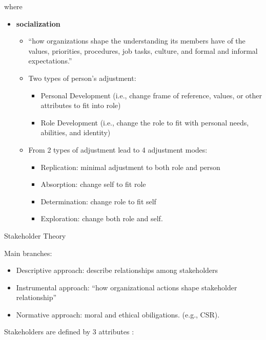\documentclass[
]{book}
\providecommand{\tightlist}{%
  \setlength{\itemsep}{0pt}\setlength{\parskip}{0pt}}
\begin{document}
where \citep{Lewis_2011}

\begin{itemize}
\item
  \textbf{socialization}

  \begin{itemize}
  \item
    ``how organizations shape the understanding its members have of the values, priorities, procedures, job tasks,
    culture, and formal and informal expectations.''
  \item
    Two types of person's adjustment:

    \begin{itemize}
    \item
      Personal Development (i.e., change frame of reference, values, or other attributes to fit into role)
    \item
      Role Development (i.e., change the role to fit with personal needs, abilities, and identity)
    \end{itemize}
  \item
    From 2 types of adjustment lead to 4 adjustment modes:

    \begin{itemize}
    \item
      Replication: minimal adjustment to both role and person
    \item
      Absorption: change self to fit role
    \item
      Determination: change role to fit self
    \item
      Exploration: change both role and self.
    \end{itemize}
  \end{itemize}
\end{itemize}

Stakeholder Theory

Main branches:

\begin{itemize}
\tightlist
\item
  Descriptive approach: describe relationships among stakeholders
\item
  Instrumental approach: ``how organizational actions shape stakeholder relationship''
\item
  Normative approach: moral and ethical obiligations. (e.g., CSR).
\end{itemize}

Stakeholders are defined by 3 attributes \citep{mitchell1997}:
\end{document}
